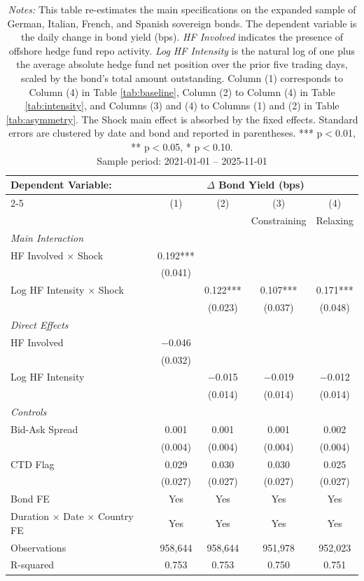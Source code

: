 \documentclass[english, 11pt, oneside]{article}
\begin{document}
\begin{table}[h!]
\centering
\caption{\textbf{Expanded Sovereign Sample}}
\footnotesize
\setlength{\tabcolsep}{8pt}
\renewcommand{\arraystretch}{1.1}
\begin{tabular}{l c c c c}
\toprule
\textbf{Dependent Variable:} & \multicolumn{4}{c}{\textbf{$\Delta$ Bond Yield (bps)}} \\
\cmidrule(lr){2-5}
 & (1) & (2) & (3) & (4) \\
 & & & Constraining & Relaxing \\
\midrule
\textit{Main Interaction} & & & & \\
HF Involved $\times$ Shock & 0.192*** & & & \\
 & (0.041) & & & \\
Log HF Intensity $\times$ Shock & & 0.122*** & 0.107*** & 0.171*** \\
 & & (0.023) & (0.037) & (0.048) \\
\addlinespace
\textit{Direct Effects} & & & & \\
HF Involved & $-$0.046 & & & \\
 & (0.032) & & & \\
Log HF Intensity & & $-$0.015 & $-$0.019 & $-$0.012 \\
 & & (0.014) & (0.014) & (0.014) \\
\addlinespace
\textit{Controls} & & & & \\
Bid-Ask Spread & 0.001 & 0.001 & 0.001 & 0.002 \\
 & (0.004) & (0.004) & (0.004) & (0.004) \\
CTD Flag & 0.029 & 0.030 & 0.030 & 0.025 \\
 & (0.027) & (0.027) & (0.027) & (0.027) \\
\midrule
Bond FE & Yes & Yes & Yes & Yes \\
Duration $\times$ Date $\times$ Country FE & Yes & Yes & Yes & Yes \\
\midrule
Observations & 958,644 & 958,644 & 951,978 & 952,023 \\
R-squared & 0.753 & 0.753 & 0.750 & 0.751 \\
\bottomrule
\end{tabular}
\label{tab:ext_val}
\caption*{\textit{Notes:} This table re-estimates the main specifications on the expanded sample of German, Italian, French, and Spanish sovereign bonds. The dependent variable is the daily change in bond yield (bps). \textit{HF Involved} indicates the presence of offshore hedge fund repo activity. \textit{Log HF Intensity} is the natural log of one plus the average absolute hedge fund net position over the prior five trading days, scaled by the bond's total amount outstanding. Column (1) corresponds to Column (4) in Table \ref{tab:baseline}, Column (2) to Column (4) in Table \ref{tab:intensity}, and Columns (3) and (4) to Columns (1) and (2) in Table \ref{tab:asymmetry}. The Shock main effect is absorbed by the fixed effects. Standard errors are clustered by date and bond and reported in parentheses. *** p$<$0.01, ** p$<$0.05, * p$<$0.10. \\ Sample period: 2021-01-01 -- 2025-11-01}
\end{table}
\end{document}
